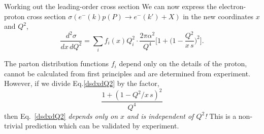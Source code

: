 \documentclass[svgnames]{beamer}
\begin{document}
\begin{frame}{Working out the leading-order cross section}
    We can now express the electron-proton cross section $\sigma(e^-(k) p(P) \rightarrow e^-(k') + X)$ in the new coordinates $x$ and $Q^2$,
\begin{equation}
    \label{dsdxdQ2}
    \frac{d^2\sigma}{dx\, dQ^2} = \sum\limits_i f_i(x) Q_i^2 \cdot \frac{2 \pi \alpha^2}{Q^4} \Bigg[ 1 + \Bigg(1-\frac{Q^2}{x\, s} \Bigg)^2 \Bigg].
\end{equation}

The parton distribution functions $f_i$ depend only on the details of the proton, cannot be calculated from first principles and are determined from experiment. \bigskip \\

However, if we divide Eq.\eqref{dsdxdQ2} by the factor,\\
\begin{equation*}
    \frac{1 + (1 - Q^2/x\, s)^2}{Q^4}
\end{equation*}
then Eq.~\eqref{dsdxdQ2} \emph{depends only on $x$ and is independent of $Q^2$!} This is a non-trivial prediction which can be validated by experiment.
\end{frame}
\end{document}
